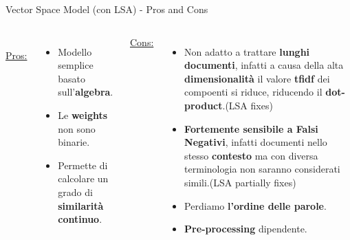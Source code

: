 \documentclass[british]{beamer}
\begin{document}
\begin{frame}{Vector Space Model (con LSA) - Pros and Cons}	
	\begin{columns}
		\\
		\underline{Pros:}
		\begin{itemize}
			\item Modello semplice basato sull'\textbf{algebra}.
			\item Le \textbf{weights} non sono binarie.
			\item Permette di calcolare un grado di \textbf{similarit\`{a} continuo}.
		\end{itemize}
		\underline{Cons:}
		\begin{itemize}
			\item Non adatto a trattare \textbf{lunghi documenti}, infatti a causa della alta \textbf{dimensionalit\`{a}} il valore \textbf{tfidf} dei compoenti si riduce, riducendo il \textbf{dot-product}.(LSA fixes)
			\item \textbf{Fortemente sensibile a Falsi Negativi}, infatti documenti nello stesso \textbf{contesto} ma con diversa terminologia non saranno considerati simili.(LSA partially fixes)
			\item Perdiamo \textbf{l'ordine delle parole}.
			\item \textbf{Pre-processing} dipendente.
		\end{itemize}
	\end{columns}
\end{frame}

\end{document}
